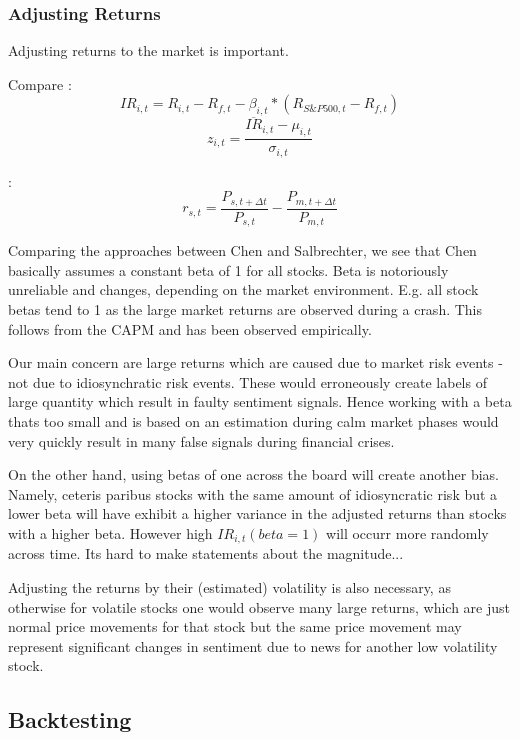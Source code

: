 \documentclass[12pt,a4paper]{article}
\begin{document}
	
	\subsubsection{Adjusting Returns}
	Adjusting returns to the market is important.
	
	Compare \cite{salbrechter_financial_2021}:
	$$
	IR_{i, t}=R_{i, t}-R_{f, t}-\beta_{i, t} *\left(R_{S \& P 500, t}-R_{f, t}\right)
	$$
	$$
	z_{i, t}=\frac{\overline{I R}_{i, t}-\mu_{i, t}}{\sigma_{i, t}}
	$$
	
	\cite{chen_stock_2021}:
	$$
	r_{s, t}=\frac{P_{s, t+\Delta t}}{P_{s, t}}-\frac{P_{m, t+\Delta t}}{P_{m, t}}
	$$
	
	Comparing the approaches between Chen and Salbrechter, we see that Chen basically assumes a constant beta of 1 for all stocks. 
	Beta is notoriously unreliable and changes, depending on the market environment.
	E.g. all stock betas tend to 1 as the large market returns are observed during a crash.
	This follows from the CAPM and has been observed empirically.
	
	Our main concern are large returns which are caused due to market risk events - not due to idiosynchratic risk events.
	These would erroneously create labels of large quantity which result in faulty sentiment signals.
	Hence working with a beta thats too small and is based on an estimation during calm market phases would very quickly result in many false signals during financial crises.
	
	On the other hand, using betas of one across the board will create another bias.
	Namely, ceteris paribus stocks with the same amount of idiosyncratic risk but a lower beta will have exhibit a higher variance in the adjusted returns than stocks with a higher beta.
	However high $IR_{i,t}(beta=1)$ will occurr more randomly across time.
	Its hard to make statements about the magnitude...
	
	Adjusting the returns by their (estimated) volatility is also necessary, as otherwise for volatile stocks
	one would observe many large returns, which are just normal price movements for that stock but the same price movement may represent significant changes in sentiment due to news for another low volatility stock.
	
	
	
	\subsection{Backtesting}
	
\end{document}
